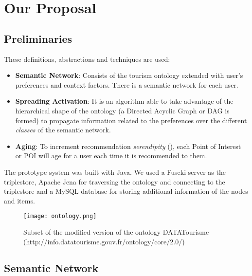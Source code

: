 \section{Our Proposal}

\subsection{Preliminaries}
These definitions, abstractions and techniques are used:
\begin{itemize}
\item \textbf{Semantic Network}: Consists of the tourism ontology extended with user's preferences and context factors. There is a semantic network for each user.
\item \textbf{Spreading Activation}: It is an algorithm able to take advantage of the hierarchical shape of the ontology (a Directed Acyclic Graph or DAG is formed) to propagate information related to the preferences over the different \textit{classes} of the semantic network.
\item \textbf{Aging}: To increment recommendation \textit{serendipity} (\cite{kotkov2016survey}), each Point of Interest or POI will age for a user each time it is recommended to them.
\end{itemize}
The prototype system was built with Java. We used a Fuseki server as the triplestore, Apache Jena for traversing the ontology and connecting to the triplestore and a MySQL database for storing additional information of the nodes and items.

\begin{figure}[h]
\centering
\texttt{[image: ontology.png]}
\caption{Subset of the modified version of the ontology DATATourisme (http://info.datatourisme.gouv.fr/ontology/core/2.0/)}
\label{fig:ontology}
\end{figure}

\subsection{Semantic Network} \label{section:semantic_network}


